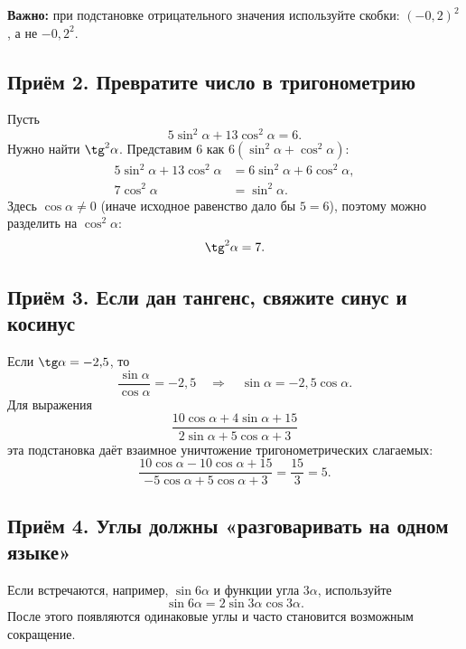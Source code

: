 \documentclass[a4paper,12pt]{article}
\newcommand{\key}[1]{\textbf{\color{darkaccent}#1}}
\begin{document}
\key{Важно:} при подстановке отрицательного значения используйте скобки: $(-0{,}2)^2$, а не $-0{,}2^2$.

\subsection*{Приём 2. Превратите число в тригонометрию}
Пусть
\[
5\sin^2\alpha+13\cos^2\alpha=6.
\]
Нужно найти $\tg^2\alpha$. Представим $6$ как $6(\sin^2\alpha+\cos^2\alpha)$:
\begin{align*}
5\sin^2\alpha+13\cos^2\alpha
 &=6\sin^2\alpha+6\cos^2\alpha,\\
7\cos^2\alpha&=\sin^2\alpha.
\end{align*}
Здесь $\cos\alpha\ne0$ (иначе исходное равенство дало бы $5=6$), поэтому можно разделить на $\cos^2\alpha$:
\[
\tg^2\alpha=7.
\]

\subsection*{Приём 3. Если дан тангенс, свяжите синус и косинус}
Если $\tg\alpha=-2{,}5$, то
\[
\frac{\sin\alpha}{\cos\alpha}=-2{,}5
\quad\Longrightarrow\quad
\sin\alpha=-2{,}5\cos\alpha.
\]
Для выражения
\[
\frac{10\cos\alpha+4\sin\alpha+15}
{2\sin\alpha+5\cos\alpha+3}
\]
эта подстановка даёт взаимное уничтожение тригонометрических слагаемых:
\[
\frac{10\cos\alpha-10\cos\alpha+15}
{-5\cos\alpha+5\cos\alpha+3}=\frac{15}{3}=5.
\]

\subsection*{Приём 4. Углы должны «разговаривать на одном языке»}
Если встречаются, например, $\sin 6\alpha$ и функции угла $3\alpha$, используйте
\[
\sin 6\alpha=2\sin 3\alpha\cos 3\alpha.
\]
После этого появляются одинаковые углы и часто становится возможным сокращение.

\clearpage
\end{document}
